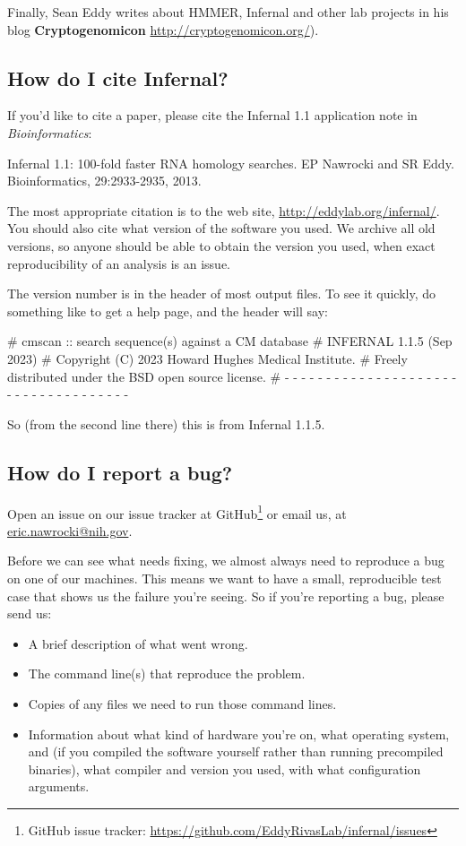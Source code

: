 Finally, Sean Eddy writes about HMMER, Infernal and other lab projects in
his blog \textbf{Cryptogenomicon} \url{http://cryptogenomicon.org/}).

\subsection{How do I cite Infernal?}

If you'd like to cite a paper, please cite the Infernal 1.1 application
note in \emph{Bioinformatics}:

Infernal 1.1: 100-fold faster RNA homology searches.
EP Nawrocki and SR Eddy.
Bioinformatics, 29:2933-2935, 2013.

The most appropriate citation is to the web site,
\url{http://eddylab.org/infernal/}. You should also cite what version
of the software you used. We archive all old versions, so anyone
should be able to obtain the version you used, when exact
reproducibility of an analysis is an issue.

The version number is in the header of most output files. To see it
quickly, do something like  to get a help page, and
the header will say:

\begin{sreoutput}
# cmscan :: search sequence(s) against a CM database
# INFERNAL 1.1.5 (Sep 2023)
# Copyright (C) 2023 Howard Hughes Medical Institute.
# Freely distributed under the BSD open source license.
# - - - - - - - - - - - - - - - - - - - - - - - - - - - - - - - - - - - -
\end{sreoutput}

So (from the second line there) this is from Infernal 1.1.5.

\subsection{How do I report a bug?}

Open an issue on our issue tracker at GitHub\footnote{GitHub issue
  tracker: \url{https://github.com/EddyRivasLab/infernal/issues}} or email us,
at \url{eric.nawrocki@nih.gov}.

Before we can see what needs fixing, we almost always need to
reproduce a bug on one of our machines. This means we want to have a
small, reproducible test case that shows us the failure you're seeing.
So if you're reporting a bug, please send us:

\begin{itemize}
 \item A brief description of what went wrong.
 \item The command line(s) that reproduce the problem.
 \item Copies of any files we need to run those command lines.
 \item Information about what kind of hardware you're on, what
   operating system, and (if you compiled the software yourself rather
   than running precompiled binaries), what compiler and version you
   used, with what configuration arguments.
\end{itemize}

